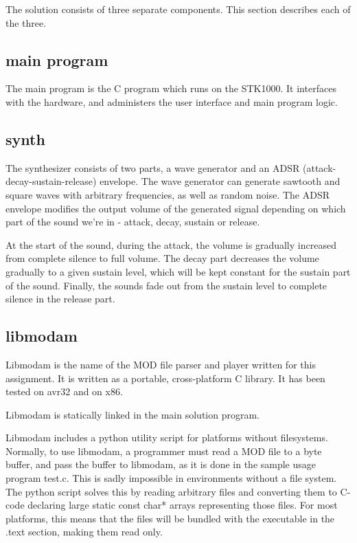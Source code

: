 The solution consists of three separate components. This section describes each of the three.

\subsection{main program}

The main program is the C program which runs on the STK1000.
It interfaces with the hardware, and administers the user interface and main program logic.

\subsection{synth}

The synthesizer consists of two parts, a wave generator and an ADSR (attack-decay-sustain-release) envelope.
The wave generator can generate sawtooth and square waves with arbitrary frequencies, as well as random noise.
The ADSR envelope modifies the output volume of the generated signal depending on which part of the sound we're in - attack, decay, sustain or release.

At the start of the sound, during the attack, the volume is gradually increased from complete silence to full volume.
The decay part decreases the volume gradually to a given sustain level, which will be kept constant for the sustain part of the sound.
Finally, the sounds fade out from the sustain level to complete silence in the release part.

\subsection{libmodam}

Libmodam is the name of the MOD file parser and player written for this assignment.
It is written as a portable, cross-platform C library.
It has been tested on avr32 and on x86.

Libmodam is statically linked in the main solution program.

Libmodam includes a python utility script for platforms without filesystems.
Normally, to use libmodam, a programmer must read a MOD file to a byte buffer, and pass the buffer to libmodam, as it is done in the sample usage program test.c.
This is sadly impossible in environments without a file system.
The python script solves this by reading arbitrary files and converting them to C-code declaring large static const char* arrays representing those files.
For most platforms, this means that the files will be bundled with the executable in the .text section, making them read only.

